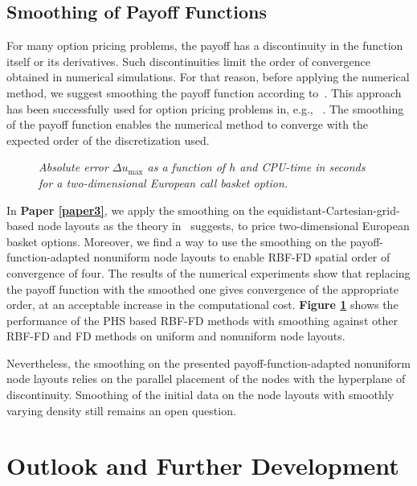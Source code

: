 \documentclass{UUThesisTemplate}
\begin{document}
%
\section{Smoothing of Payoff Functions}

\par
For many option pricing problems, the payoff has a discontinuity in the function itself or its derivatives. Such discontinuities limit the order of convergence obtained in numerical simulations. For that reason, before applying the numerical method, we suggest smoothing the payoff function according to~\cite{kreiss1970smoothing}. This approach has been successfully used for option pricing problems in, e.g., ~\cite{pooley2003convergence, during2015high}. The smoothing of the payoff function enables the numerical method to converge with the expected order of the discretization used. 

\begin{figure}[H]
\centering
\hspace{11pt}

\caption{\emph{Absolute error $\Delta u_{\max}$ as a function of $h$ and CPU-time in seconds for a two-dimensional European call basket option.}}
\label{fig:smoothing}
\end{figure}

\par
In \textbf{Paper \ref{paper3}}, we apply the smoothing on the equidistant-Cartesian-grid-based node layouts as the theory in~\cite{kreiss1970smoothing} suggests, to price two-dimensional European basket options. Moreover, we find a way to use the smoothing on the payoff-function-adapted nonuniform node layouts to enable RBF-FD spatial order of convergence of four. The results of the numerical experiments show that replacing the payoff function with the smoothed one gives convergence of the appropriate order, at an acceptable increase in the computational cost. \textbf{Figure \ref{fig:smoothing}} shows the performance of the PHS based RBF-FD methods with smoothing against other RBF-FD and FD methods on uniform and nonuniform node layouts. 

\par
Nevertheless, the smoothing on the presented payoff-function-adapted nonuniform node layouts relies on the parallel placement of the nodes with the hyperplane of discontinuity. Smoothing of the initial data on the node layouts with smoothly varying density still remains an open question. 


%
\chapter{Outlook and Further Development}
\label{ch:outlook}
\end{document}
